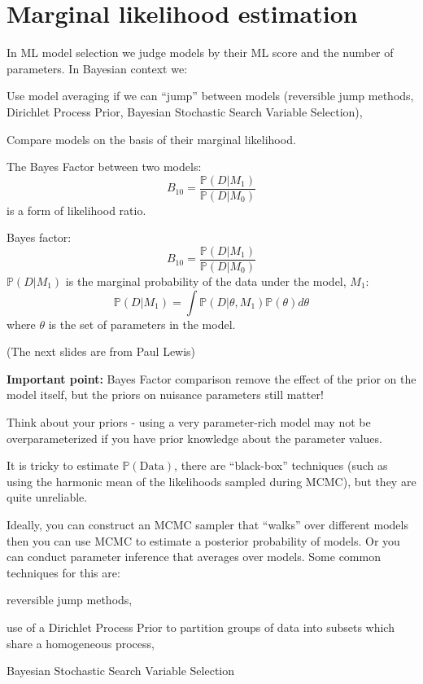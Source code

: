 
\usepackage{cancel}
\renewcommand{\Pr}{\mathbb{P}}


\pagecolor{white}
\MyLogo{}
\unitlength=1mm


\section*{Marginal likelihood estimation}
In ML model selection we judge models by their ML score and the number of parameters.
In Bayesian context we:
\begin{compactitem}
	\item Use model averaging if we can ``jump'' between models (reversible jump methods, Dirichlet Process Prior, Bayesian Stochastic Search Variable Selection),
	\item Compare models on the basis of their marginal likelihood.
\end{compactitem}

The Bayes Factor between two models:
\[B_{10} = \frac{\Pr(D|M_1)}{\Pr(D|M_0)}\]
 is a form of likelihood ratio.\\
\myNewSlide

\myNewSlide
Bayes factor:
\[B_{10} = \frac{\Pr(D|M_1)}{\Pr(D|M_0)}\]
\vskip 2cm
$\Pr(D|M_1)$ is the marginal probability of the data under the model, $M_1$:
\[\Pr(D|M_1) = \int\Pr(D|\theta, M_1)\Pr(\theta)d\theta \]
where $\theta$ is the set of parameters in the model.


{\small (The next slides are from Paul Lewis)}

 

\myNewSlide
 

\myNewSlide
{\bf Important point:} Bayes Factor comparison remove the effect of the prior on the model itself, but the priors on nuisance parameters still matter!

Think about your priors - using a very parameter-rich model may not be overparameterized if you have prior knowledge about the parameter values.

It is tricky to estimate $\Pr(\mbox{Data})$, there are ``black-box'' techniques (such as using the harmonic mean of the likelihoods sampled during MCMC), but they are quite unreliable.

Ideally, you can construct an MCMC sampler that ``walks'' over different models then you can use MCMC to estimate a posterior probability of models.
Or you can conduct parameter inference that averages over models. 
Some common techniques for this are:
\begin{compactitem}
	\item reversible jump methods, 
	\item use of a Dirichlet Process Prior to partition groups of data into subsets which share a homogeneous process,
	\item  Bayesian Stochastic Search Variable Selection
\end{compactitem}

